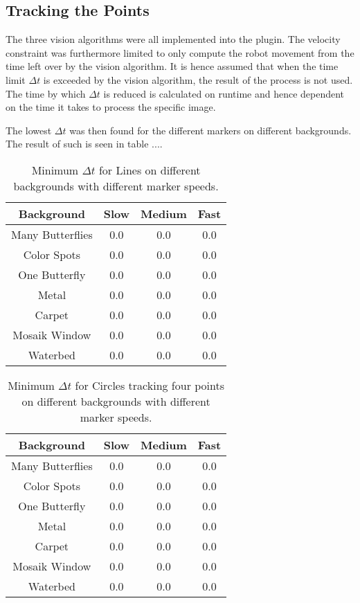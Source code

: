 \subsection{Tracking the Points}
The three vision algorithms were all implemented into the plugin.
The velocity constraint was furthermore limited to only compute the robot movement from the time left over by the vision algorithm.
It is hence assumed that when the time limit $\Delta t$ is exceeded by the vision algorithm, the result of the process is not used.
The time by which $\Delta t$ is reduced is calculated on runtime and hence dependent on the time it takes to process the specific image.

The lowest $\Delta t$ was then found for the different markers on different backgrounds.
The result of such is seen in table ....


\begin{table}[H]
\center
\begin{tabular}{|c|c|c|c|}
\hline
Background & Slow & Medium & Fast \\ \hline
Many Butterflies & 0.0 & 0.0 & 0.0 \\ \hline
Color Spots & 0.0 & 0.0 & 0.0 \\ \hline
One Butterfly & 0.0 & 0.0 & 0.0 \\ \hline
Metal & 0.0 & 0.0 & 0.0 \\ \hline
Carpet & 0.0 & 0.0 & 0.0 \\ \hline
Mosaik Window & 0.0 & 0.0 & 0.0 \\ \hline
Waterbed & 0.0 & 0.0 & 0.0 \\ \hline
\end{tabular}
\caption{Minimum $\Delta t$ for Lines on different backgrounds with different marker speeds.}
\end{table}

\begin{table}[H]
\center
\begin{tabular}{|c|c|c|c|}
\hline
Background & Slow & Medium & Fast \\ \hline
Many Butterflies & 0.0 & 0.0 & 0.0 \\ \hline
Color Spots & 0.0 & 0.0 & 0.0 \\ \hline
One Butterfly & 0.0 & 0.0 & 0.0 \\ \hline
Metal & 0.0 & 0.0 & 0.0 \\ \hline
Carpet & 0.0 & 0.0 & 0.0 \\ \hline
Mosaik Window & 0.0 & 0.0 & 0.0 \\ \hline
Waterbed & 0.0 & 0.0 & 0.0 \\ \hline
\end{tabular}
\caption{Minimum $\Delta t$ for Circles tracking four points on different backgrounds with different marker speeds.}
\end{table}


